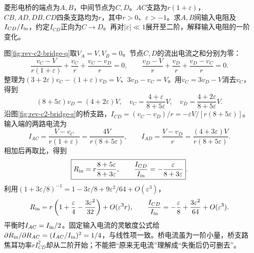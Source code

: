 \begin{exercise}[电桥失衡后的电流与灵敏度]\label{ex:rev-c2-bridge}
菱形电桥的端点为$A,B$，中间节点为$C,D$。$AC$支路为$r(1+\varepsilon)$，$CB,AD,DB,CD$四条支路均为$r$，其中$r>0$、$\varepsilon>-1$。求$A,B$间输入电阻及$I_{CD}/I_{\rm in}$，约定$I_{CD}$正向为$C\to D$。再对$|\varepsilon|\ll1$展开至二阶，解释输入电阻的一阶变化。
\end{exercise}
\begin{solution}
图\ref{fig:rev-c2-bridge-q}取$V_A=V,V_B=0$。节点$C,D$的流出电流之和分别为零：
\[
 \frac{v_C-V}{r(1+\varepsilon)}+\frac{v_C}{r}+\frac{v_C-v_D}{r}=0,
 \qquad \frac{v_D-V}{r}+\frac{v_D}{r}+\frac{v_D-v_C}{r}=0.
\]
整理为$(3+2\varepsilon)v_C-(1+\varepsilon)v_D=V$、$3v_D-v_C=V$。用$v_C=3v_D-V$消去$v_C$，得到
\[
 (8+5\varepsilon)v_D=(4+2\varepsilon)V,
 \quad v_C=\frac{4+\varepsilon}{8+5\varepsilon}V,
 \quad v_D=\frac{4+2\varepsilon}{8+5\varepsilon}V.
\]
沿图\ref{fig:rev-c2-bridge-s}的桥支路，$I_{CD}=(v_C-v_D)/r=-\varepsilon V/[r(8+5\varepsilon)]$。输入端的两路电流为
\[
 I_{AC}=\frac{V-v_C}{r(1+\varepsilon)}=\frac{4V}{r(8+5\varepsilon)},\qquad
 I_{AD}=\frac{V-v_D}{r}=\frac{(4+3\varepsilon)V}{r(8+5\varepsilon)}.
\]
相加后再取比，得到
\[
 \boxed{R_{\rm in}=r\frac{8+5\varepsilon}{8+3\varepsilon},\qquad
 \frac{I_{CD}}{I_{\rm in}}=-\frac{\varepsilon}{8+3\varepsilon}}.
\]
利用$(1+3\varepsilon/8)^{-1}=1-3\varepsilon/8+9\varepsilon^2/64+O(\varepsilon^3)$，
\[
 R_{\rm in}=r\left(1+\frac\varepsilon4-\frac{3\varepsilon^2}{32}\right)+O(\varepsilon^3r),\qquad
 \frac{I_{CD}}{I_{\rm in}}=-\frac\varepsilon8+\frac{3\varepsilon^2}{64}+O(\varepsilon^3).
\]
平衡时$I_{AC}=I_{\rm in}/2$。固定输入电流的灵敏度公式给
$\partial R_{\rm in}/\partial R_{AC}=(I_{AC}/I_{\rm in})^2=1/4$，与线性项一致。桥电流虽为一阶小量，桥支路焦耳功率$rI_{CD}^2$却从二阶开始；不能把“原来无电流”理解成“失衡后仍可删去”。
\end{solution}

